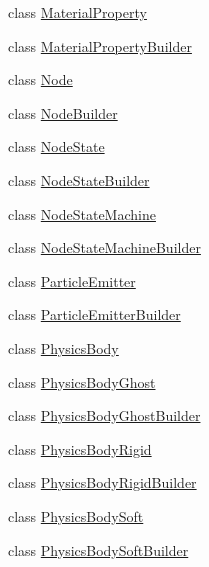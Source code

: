 \begin{DoxyCompactItemize}
\item 
class \mbox{\hyperlink{classnjli_1_1_world_factory_ae7c7f3376b81514442fbc2a5fe2f5ec9}{Material\+Property}}
\item 
class \mbox{\hyperlink{classnjli_1_1_world_factory_aba999bd8688594614e940d994d71b864}{Material\+Property\+Builder}}
\item 
class \mbox{\hyperlink{classnjli_1_1_world_factory_a6db9d28bd448a131448276ee03de1e6d}{Node}}
\item 
class \mbox{\hyperlink{classnjli_1_1_world_factory_a3698ada19fa4946ec1b589a2b23e695f}{Node\+Builder}}
\item 
class \mbox{\hyperlink{classnjli_1_1_world_factory_adfdd1242f00ef4da9a9a01d996fc292c}{Node\+State}}
\item 
class \mbox{\hyperlink{classnjli_1_1_world_factory_ab5f35f6c48aabf3adba3148d9e5017b4}{Node\+State\+Builder}}
\item 
class \mbox{\hyperlink{classnjli_1_1_world_factory_a37124479a38545f4b2bec91d7f6acda0}{Node\+State\+Machine}}
\item 
class \mbox{\hyperlink{classnjli_1_1_world_factory_aa0337fe62ed48d71c7fb641e4588d796}{Node\+State\+Machine\+Builder}}
\item 
class \mbox{\hyperlink{classnjli_1_1_world_factory_a82b374d797a09668286ac5cf26f539f3}{Particle\+Emitter}}
\item 
class \mbox{\hyperlink{classnjli_1_1_world_factory_a4663c75ff33f5066276a2beef9a10b57}{Particle\+Emitter\+Builder}}
\item 
class \mbox{\hyperlink{classnjli_1_1_world_factory_a5602338bf4d8e0e6baa58d3daa8dc90a}{Physics\+Body}}
\item 
class \mbox{\hyperlink{classnjli_1_1_world_factory_a75e9d5e413912c976f8b366674be6676}{Physics\+Body\+Ghost}}
\item 
class \mbox{\hyperlink{classnjli_1_1_world_factory_a36d224b713bd19fb758d964b8111182a}{Physics\+Body\+Ghost\+Builder}}
\item 
class \mbox{\hyperlink{classnjli_1_1_world_factory_ada345e4f9c2a87f06868b74d30e94ad2}{Physics\+Body\+Rigid}}
\item 
class \mbox{\hyperlink{classnjli_1_1_world_factory_ac3d9efde8beb285372a9042d055c738a}{Physics\+Body\+Rigid\+Builder}}
\item 
class \mbox{\hyperlink{classnjli_1_1_world_factory_a8aab1bff165cf88cf8e13fb00b2b5f1e}{Physics\+Body\+Soft}}
\item 
class \mbox{\hyperlink{classnjli_1_1_world_factory_af4691e69bff78222d4abfff307c0bcb9}{Physics\+Body\+Soft\+Builder}}

\end{DoxyCompactItemize}
